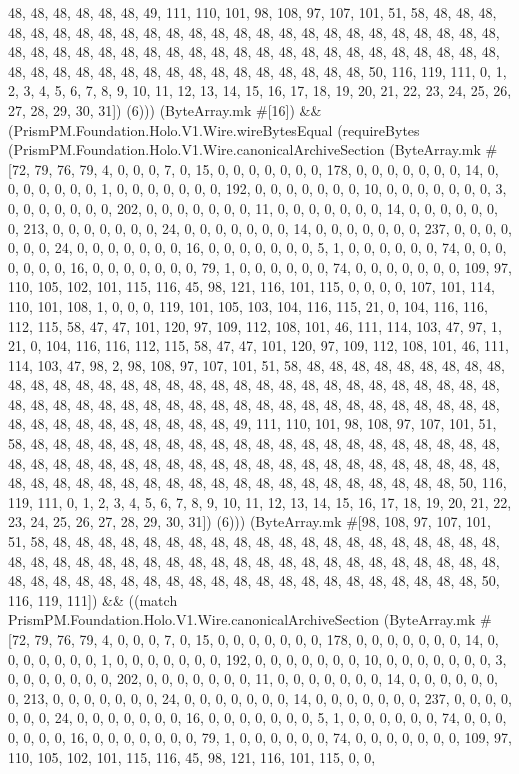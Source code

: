 \documentclass[11pt]{article}
\begin{document}
48, 48, 48, 48, 48, 48, 49, 111, 110, 101, 98, 108, 97, 107, 101, 51, 58, 48, 48, 48, 48, 48, 48, 48, 48, 48, 48, 48, 48, 48, 48, 48, 48, 48, 48, 48, 48, 48, 48, 48, 48, 48, 48, 48, 48, 48, 48, 48, 48, 48, 48, 48, 48, 48, 48, 48, 48, 48, 48, 48, 48, 48, 48, 48, 48, 48, 48, 48, 48, 48, 48, 48, 48, 48, 48, 48, 48, 48, 48, 48, 50, 116, 119, 111, 0, 1, 2, 3, 4, 5, 6, 7, 8, 9, 10, 11, 12, 13, 14, 15, 16, 17, 18, 19, 20, 21, 22, 23, 24, 25, 26, 27, 28, 29, 30, 31]) (6))) (ByteArray.mk \#[16]) \&\& (PrismPM.Foundation.Holo.V1.Wire.wireBytesEqual (requireBytes (PrismPM.Foundation.Holo.V1.Wire.canonicalArchiveSection (ByteArray.mk \#[72, 79, 76, 79, 4, 0, 0, 0, 7, 0, 15, 0, 0, 0, 0, 0, 0, 0, 178, 0, 0, 0, 0, 0, 0, 0, 14, 0, 0, 0, 0, 0, 0, 0, 1, 0, 0, 0, 0, 0, 0, 0, 192, 0, 0, 0, 0, 0, 0, 0, 10, 0, 0, 0, 0, 0, 0, 0, 3, 0, 0, 0, 0, 0, 0, 0, 202, 0, 0, 0, 0, 0, 0, 0, 11, 0, 0, 0, 0, 0, 0, 0, 14, 0, 0, 0, 0, 0, 0, 0, 213, 0, 0, 0, 0, 0, 0, 0, 24, 0, 0, 0, 0, 0, 0, 0, 14, 0, 0, 0, 0, 0, 0, 0, 237, 0, 0, 0, 0, 0, 0, 0, 24, 0, 0, 0, 0, 0, 0, 0, 16, 0, 0, 0, 0, 0, 0, 0, 5, 1, 0, 0, 0, 0, 0, 0, 74, 0, 0, 0, 0, 0, 0, 0, 16, 0, 0, 0, 0, 0, 0, 0, 79, 1, 0, 0, 0, 0, 0, 0, 74, 0, 0, 0, 0, 0, 0, 0, 109, 97, 110, 105, 102, 101, 115, 116, 45, 98, 121, 116, 101, 115, 0, 0, 0, 0, 107, 101, 114, 110, 101, 108, 1, 0, 0, 0, 119, 101, 105, 103, 104, 116, 115, 21, 0, 104, 116, 116, 112, 115, 58, 47, 47, 101, 120, 97, 109, 112, 108, 101, 46, 111, 114, 103, 47, 97, 1, 21, 0, 104, 116, 116, 112, 115, 58, 47, 47, 101, 120, 97, 109, 112, 108, 101, 46, 111, 114, 103, 47, 98, 2, 98, 108, 97, 107, 101, 51, 58, 48, 48, 48, 48, 48, 48, 48, 48, 48, 48, 48, 48, 48, 48, 48, 48, 48, 48, 48, 48, 48, 48, 48, 48, 48, 48, 48, 48, 48, 48, 48, 48, 48, 48, 48, 48, 48, 48, 48, 48, 48, 48, 48, 48, 48, 48, 48, 48, 48, 48, 48, 48, 48, 48, 48, 48, 48, 48, 48, 48, 48, 48, 48, 49, 111, 110, 101, 98, 108, 97, 107, 101, 51, 58, 48, 48, 48, 48, 48, 48, 48, 48, 48, 48, 48, 48, 48, 48, 48, 48, 48, 48, 48, 48, 48, 48, 48, 48, 48, 48, 48, 48, 48, 48, 48, 48, 48, 48, 48, 48, 48, 48, 48, 48, 48, 48, 48, 48, 48, 48, 48, 48, 48, 48, 48, 48, 48, 48, 48, 48, 48, 48, 48, 48, 48, 48, 48, 50, 116, 119, 111, 0, 1, 2, 3, 4, 5, 6, 7, 8, 9, 10, 11, 12, 13, 14, 15, 16, 17, 18, 19, 20, 21, 22, 23, 24, 25, 26, 27, 28, 29, 30, 31]) (6))) (ByteArray.mk \#[98, 108, 97, 107, 101, 51, 58, 48, 48, 48, 48, 48, 48, 48, 48, 48, 48, 48, 48, 48, 48, 48, 48, 48, 48, 48, 48, 48, 48, 48, 48, 48, 48, 48, 48, 48, 48, 48, 48, 48, 48, 48, 48, 48, 48, 48, 48, 48, 48, 48, 48, 48, 48, 48, 48, 48, 48, 48, 48, 48, 48, 48, 48, 48, 48, 48, 48, 48, 48, 48, 50, 116, 119, 111]) \&\& ((match PrismPM.Foundation.Holo.V1.Wire.canonicalArchiveSection (ByteArray.mk \#[72, 79, 76, 79, 4, 0, 0, 0, 7, 0, 15, 0, 0, 0, 0, 0, 0, 0, 178, 0, 0, 0, 0, 0, 0, 0, 14, 0, 0, 0, 0, 0, 0, 0, 1, 0, 0, 0, 0, 0, 0, 0, 192, 0, 0, 0, 0, 0, 0, 0, 10, 0, 0, 0, 0, 0, 0, 0, 3, 0, 0, 0, 0, 0, 0, 0, 202, 0, 0, 0, 0, 0, 0, 0, 11, 0, 0, 0, 0, 0, 0, 0, 14, 0, 0, 0, 0, 0, 0, 0, 213, 0, 0, 0, 0, 0, 0, 0, 24, 0, 0, 0, 0, 0, 0, 0, 14, 0, 0, 0, 0, 0, 0, 0, 237, 0, 0, 0, 0, 0, 0, 0, 24, 0, 0, 0, 0, 0, 0, 0, 16, 0, 0, 0, 0, 0, 0, 0, 5, 1, 0, 0, 0, 0, 0, 0, 74, 0, 0, 0, 0, 0, 0, 0, 16, 0, 0, 0, 0, 0, 0, 0, 79, 1, 0, 0, 0, 0, 0, 0, 74, 0, 0, 0, 0, 0, 0, 0, 109, 97, 110, 105, 102, 101, 115, 116, 45, 98, 121, 116, 101, 115, 0, 0, 
\end{document}
